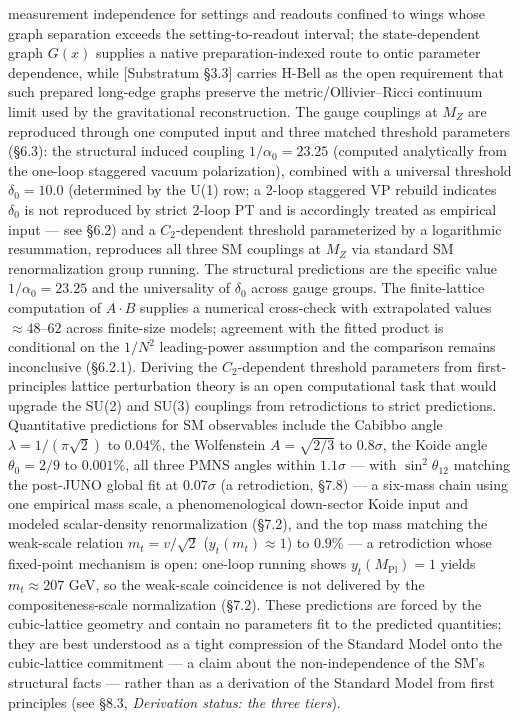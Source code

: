 \documentclass[
]{article}
\begin{document}
measurement independence for settings and readouts confined to wings
whose graph separation exceeds the setting-to-readout interval; the
state-dependent graph \(G(x)\) supplies a native preparation-indexed
route to ontic parameter dependence, while {[}Substratum §3.3{]} carries
H-Bell as the open requirement that such prepared long-edge graphs
preserve the metric/Ollivier--Ricci continuum limit used by the
gravitational reconstruction. The gauge couplings at \(M_Z\) are
reproduced through one computed input and three matched threshold
parameters (§6.3): the structural induced coupling
\(1/\alpha_0 = 23.25\) (computed analytically from the one-loop
staggered vacuum polarization), combined with a universal threshold
\(\delta_0 = 10.0\) (determined by the U(1) row; a 2-loop staggered VP
rebuild indicates \(\delta_0\) is not reproduced by strict 2-loop PT and
is accordingly treated as empirical input --- see §6.2) and a
\(C_2\)-dependent threshold parameterized by a logarithmic resummation,
reproduces all three SM couplings at \(M_Z\) via standard SM
renormalization group running. The structural predictions are the
specific value \(1/\alpha_0 = 23.25\) and the universality of
\(\delta_0\) across gauge groups. The finite-lattice computation of
\(A \cdot B\) supplies a numerical cross-check with extrapolated values
\(\approx 48\)--\(62\) across finite-size models; agreement with the
fitted product is conditional on the \(1/N^2\) leading-power assumption
and the comparison remains inconclusive (§6.2.1). Deriving the
\(C_2\)-dependent threshold parameters from first-principles lattice
perturbation theory is an open computational task that would upgrade the
SU(2) and SU(3) couplings from retrodictions to strict predictions.
Quantitative predictions for SM observables include the Cabibbo angle
\(\lambda = 1/(\pi\sqrt{2})\) to \(0.04\%\), the Wolfenstein
\(A = \sqrt{2/3}\) to \(0.8\sigma\), the Koide angle \(\theta_0 = 2/9\)
to \(0.001\%\), all three PMNS angles within \(1.1\sigma\) --- with
\(\sin^2\theta_{12}\) matching the post-JUNO global fit at
\(0.07\sigma\) (a retrodiction, §7.8) --- a six-mass chain using one
empirical mass scale, a phenomenological down-sector Koide input and
modeled scalar-density renormalization (§7.2), and the top mass matching
the weak-scale relation \(m_t = v/\sqrt{2}\) (\(y_t(m_t) \approx 1\)) to
\(0.9\%\) --- a retrodiction whose fixed-point mechanism is open:
one-loop running shows \(y_t(M_{\text{Pl}}) = 1\) yields
\(m_t \approx 207\) GeV, so the weak-scale coincidence is not delivered
by the compositeness-scale normalization (§7.2). These predictions are
forced by the cubic-lattice geometry and contain no parameters fit to
the predicted quantities; they are best understood as a tight
compression of the Standard Model onto the cubic-lattice commitment ---
a claim about the non-independence of the SM's structural facts ---
rather than as a derivation of the Standard Model from first principles
(see §8.3, \emph{Derivation status: the three tiers}).
\end{document}
